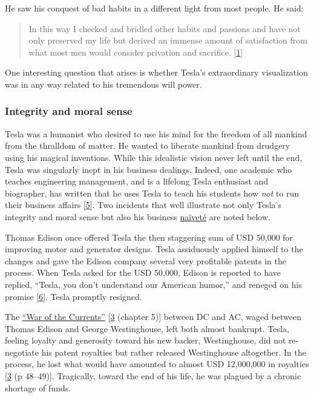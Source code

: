 \documentclass[
  a4paper,
]{article}
\begin{document}
He saw his conquest of bad habits in a different light from most people.
He said:

\begin{quote}
In this way I checked and bridled other habits and passions and have not
only preserved my life but derived an immense amount of satisfaction
from what most men would consider privation and sacrifice.
{[}\protect\hyperlink{ref-john83}{1}{]}
\end{quote}

One interesting question that arises is whether Tesla's extraordinary
visualization was in any way related to his tremendous will power.

\hypertarget{integrity-and-moral-sense}{%
\subsubsection{Integrity and moral
sense}\label{integrity-and-moral-sense}}

Tesla was a humanist who desired to use his mind for the freedom of all
mankind from the thralldom of matter. He wanted to liberate mankind from
drudgery using his magical inventions. While this idealistic vision
never left until the end, Tesla was singularly inept in his business
dealings. Indeed, one academic who teaches engineering management, and
is a lifelong Tesla enthusiast and biographer, has written that he uses
Tesla to teach his students how \emph{not} to run their business affairs
{[}\protect\hyperlink{ref-lomas99}{5}{]}. Two incidents that well
illustrate not only Tesla's integrity and moral sense but also his
business \href{https://www.thefreedictionary.com/naivete}{naïveté} are
noted below.

Thomas Edison once offered Tesla the then staggering sum of USD 50,000
for improving motor and generator designs. Tesla assiduously applied
himself to the changes and gave the Edison company several very
profitable patents in the process. When Tesla asked for the USD 50,000,
Edison is reported to have replied, ``Tesla, you don't understand our
American humor,'' and reneged on his promise
{[}\protect\hyperlink{ref-tesla-wiki}{6}{]}. Tesla promptly resigned.

The \href{https://en.wikipedia.org/wiki/War_of_the_currents}{``War of
the Currents''} {[}\protect\hyperlink{ref-cheney81}{3} (chapter 5){]}
between DC and AC, waged between Thomas Edison and George Westinghouse,
left both almost bankrupt. Tesla, feeling loyalty and generosity toward
his new backer, Westinghouse, did not re-negotiate his patent royalties
but rather released Westinghouse altogether. In the process, he lost
what would have amounted to almost USD 12,000,000 in royalties
{[}\protect\hyperlink{ref-cheney81}{3} (p 48--49){]}. Tragically, toward
the end of his life, he was plagued by a chronic shortage of funds.
\end{document}
